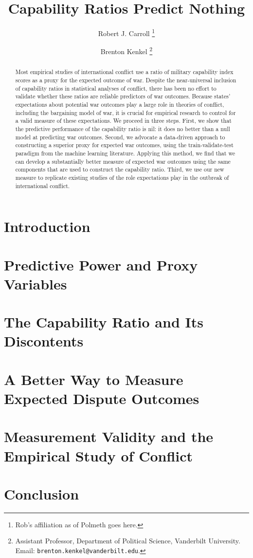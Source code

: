 \documentclass[11pt,oneside]{article}
\title{
  Capability Ratios Predict Nothing%
}
\author{%
  Robert J. Carroll%
  \thanks{%
    Rob's affiliation as of Polmeth goes here.
  }%
  \and%
  Brenton Kenkel%
  \thanks{
    Assistant Professor, Department of Political Science, Vanderbilt University.
    Email: \nolinkurl{brenton.kenkel@vanderbilt.edu}.
  }%
}
\begin{document}
\maketitle

\begin{abstract}
  Most empirical studies of international conflict use a ratio of military capability index scores as a proxy for the expected outcome of war.
  Despite the near-universal inclusion of capability ratios in statistical analyses of conflict, there has been no effort to validate whether these ratios are reliable predictors of war outcomes.
  Because states' expectations about potential war outcomes play a large role in theories of conflict, including the bargaining model of war, it is crucial for empirical research to control for a valid measure of these expectations.
  We proceed in three steps.
  First, we show that the predictive performance of the capability ratio is nil: it does no better than a null model at predicting war outcomes.
  Second, we advocate a data-driven approach to constructing a superior proxy for expected war outcomes, using the train-validate-test paradigm from the machine learning literature.
  Applying this method, we find that we can develop a substantially better measure of expected war outcomes using the same components that are used to construct the capability ratio.
  Third, we use our new measure to replicate existing studies of the role expectations play in the outbreak of international conflict.
\end{abstract}


\section{Introduction}


\section{Predictive Power and Proxy Variables}


\section{The Capability Ratio and Its Discontents}


\section{A Better Way to Measure Expected Dispute Outcomes}


\section{Measurement Validity and the Empirical Study of Conflict}


\section{Conclusion}
\end{document}
